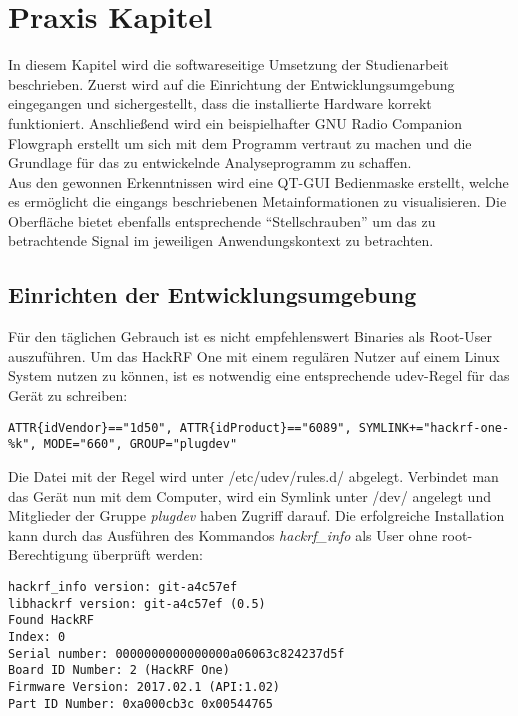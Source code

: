 
\chapter{Praxis Kapitel}
In diesem Kapitel wird die softwareseitige Umsetzung der Studienarbeit beschrieben. Zuerst wird auf die Einrichtung der Entwicklungsumgebung eingegangen und sichergestellt, dass die installierte Hardware korrekt funktioniert. Anschließend wird ein beispielhafter GNU Radio Companion Flowgraph erstellt um sich mit dem Programm vertraut zu machen und die Grundlage für das zu entwickelnde Analyseprogramm zu schaffen.\\
Aus den gewonnen Erkenntnissen wird eine QT-GUI Bedienmaske erstellt, welche es ermöglicht die eingangs beschriebenen Metainformationen zu visualisieren. Die Oberfläche bietet ebenfalls entsprechende \enquote{Stellschrauben} um das zu betrachtende Signal im jeweiligen Anwendungskontext zu betrachten. 


\section{Einrichten der Entwicklungsumgebung}
Für den täglichen Gebrauch ist es nicht empfehlenswert Binaries als Root-User auszuführen. Um das HackRF One mit einem regulären Nutzer auf einem Linux System nutzen zu können, ist es notwendig eine entsprechende udev-Regel für das Gerät zu schreiben:

\begin{lstlisting}[caption=Erstellen einer udev-Regel, label=udev]
ATTR{idVendor}=="1d50", ATTR{idProduct}=="6089", SYMLINK+="hackrf-one-%k", MODE="660", GROUP="plugdev"
\end{lstlisting}

Die Datei mit der Regel wird unter /etc/udev/rules.d/ abgelegt. Verbindet man das Gerät nun mit dem Computer, wird ein Symlink unter /dev/ angelegt und Mitglieder der Gruppe \textit{plugdev} haben Zugriff darauf. 
Die erfolgreiche Installation kann durch das Ausführen des Kommandos \textit{hackrf\_info} als User ohne root-Berechtigung überprüft werden:
\begin{lstlisting}[caption=Das Kommando "hackrf\_info" wird zum Test auf dem System ausgeführt, label=hackrfinfo]
hackrf_info version: git-a4c57ef
libhackrf version: git-a4c57ef (0.5)
Found HackRF
Index: 0
Serial number: 0000000000000000a06063c824237d5f
Board ID Number: 2 (HackRF One)
Firmware Version: 2017.02.1 (API:1.02)
Part ID Number: 0xa000cb3c 0x00544765
\end{lstlisting}

